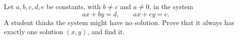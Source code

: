 Let $a,b,c,d,e$ be constants, with $b\ne c$ and $a\ne0$, in the system
\[
ax+by=d,\qquad ax+cy=e .
\]
A student thinks the system might have no solution. Prove that it always has exactly one solution $(x,y)$, and find it.
